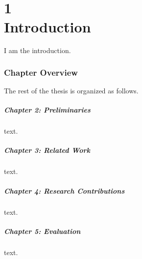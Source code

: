 \chapter[Introduction]{1\\Introduction}
\label{chap:intro}
I am the introduction.

\subsection*{Chapter Overview}
The rest of the thesis is organized as follows.

\paragraph{Chapter 2: Preliminaries} text.

\paragraph{Chapter 3: Related Work} text.

\paragraph{Chapter 4: Research Contributions} text.

\paragraph{Chapter 5: Evaluation} text.
